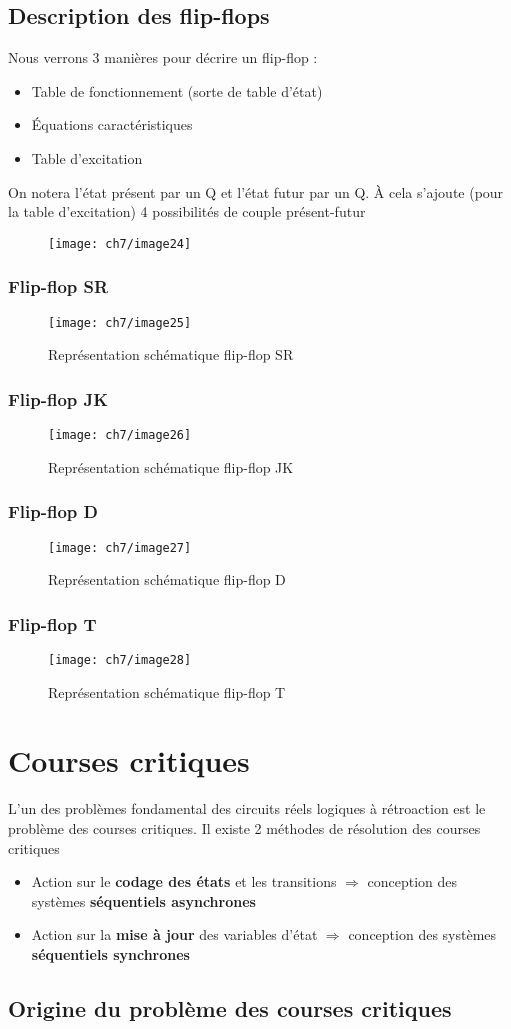 \subsection{Description des flip-flops}
Nous verrons 3 manières pour décrire un flip-flop :
\begin{itemize}
	\item Table de fonctionnement (sorte de table d'état)
	\item Équations caractéristiques
	\item Table d'excitation 
\end{itemize}
On notera l'état présent par un Q et l'état futur par un Q\up{+}. À cela s'ajoute (pour la table d'excitation) 4 possibilités de couple présent-futur
\begin{figure}[H]
	\centering
	\texttt{[image: ch7/image24]}
\end{figure}
\subsubsection{Flip-flop SR}
\begin{figure}[H]
	\centering
	\texttt{[image: ch7/image25]}
	\caption{Représentation schématique flip-flop SR}
\end{figure}
\subsubsection{Flip-flop JK}
\begin{figure}[H]
	\centering
	\texttt{[image: ch7/image26]}
	\caption{Représentation schématique flip-flop JK}
\end{figure}
\subsubsection{Flip-flop D}
\begin{figure}[H]
	\centering
	\texttt{[image: ch7/image27]}
	\caption{Représentation schématique flip-flop D}
\end{figure}
\subsubsection{Flip-flop T}
\begin{figure}[H]
	\centering
	\texttt{[image: ch7/image28]}
	\caption{Représentation schématique flip-flop T}
\end{figure}
\section{Courses critiques}
L'un des problèmes fondamental des circuits réels logiques à rétroaction est le problème des courses critiques. Il existe 2 méthodes de résolution des courses critiques 
\begin{itemize}
	\item Action sur le \textbf{codage des états} et les transitions $\Rightarrow$ conception des systèmes \textbf{séquentiels asynchrones}
	\item Action sur la \textbf{mise à jour} des variables d'état $\Rightarrow$ conception des systèmes \textbf{séquentiels synchrones}
\end{itemize}
\subsection{Origine du problème des courses critiques}
